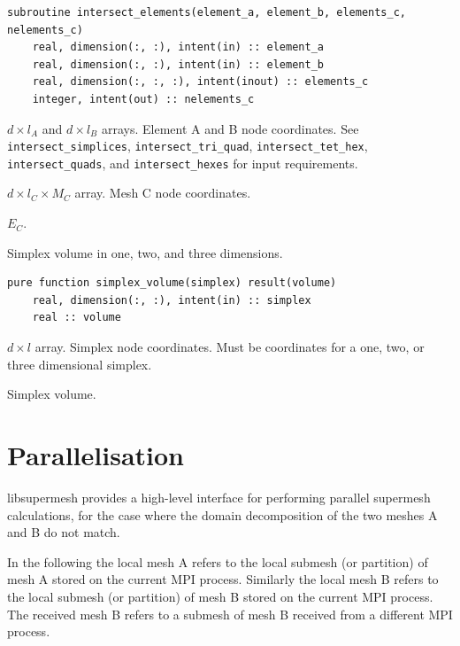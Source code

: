 \documentclass{article}
\begin{document}
\begin{lstlisting}[language=FORTRAN]
  subroutine intersect_elements(element_a, element_b, elements_c, nelements_c)
    real, dimension(:, :), intent(in) :: element_a
    real, dimension(:, :), intent(in) :: element_b
    real, dimension(:, :, :), intent(inout) :: elements_c
    integer, intent(out) :: nelements_c
\end{lstlisting}

\begin{description}[font=\ttfamily\bfseries,leftmargin=2.2\parindent,labelindent=1.7\parindent,noitemsep]
  \item[element\_a, element\_b] $d \times l_A$ and $d \times l_B$ arrays.
    Element A and B node coordinates. See \verb+intersect_simplices+,
    \verb+intersect_tri_quad+, \verb+intersect_tet_hex+, \verb+intersect_quads+,
    and \verb+intersect_hexes+ for input requirements.
  \item[elements\_c] $d \times l_C \times M_C$ array. Mesh C node coordinates.
  \item[n\_simplices\_c] $E_C$.
\end{description}

\noindent Simplex volume in one, two, and three dimensions.

\begin{lstlisting}[language=FORTRAN]
  pure function simplex_volume(simplex) result(volume)
    real, dimension(:, :), intent(in) :: simplex
    real :: volume
\end{lstlisting}

\begin{description}[font=\ttfamily\bfseries,leftmargin=2.2\parindent,labelindent=1.7\parindent,noitemsep]
  \item[simplex] $d \times l$ array. Simplex node coordinates. Must be
    coordinates for a one, two, or three dimensional simplex.
  \item[volume] Simplex volume.
\end{description}

\section{Parallelisation}

libsupermesh provides a high-level interface for performing parallel supermesh
calculations, for the case where the domain decomposition of the two meshes A
and B do not match. 

In the following the local mesh A refers to the local submesh (or partition) of
mesh A stored on the current MPI process. Similarly the local mesh B refers to
the local submesh (or partition) of mesh B stored on the current MPI process.
The received mesh B refers to a submesh of mesh B received from a different MPI
process.
\end{document}
